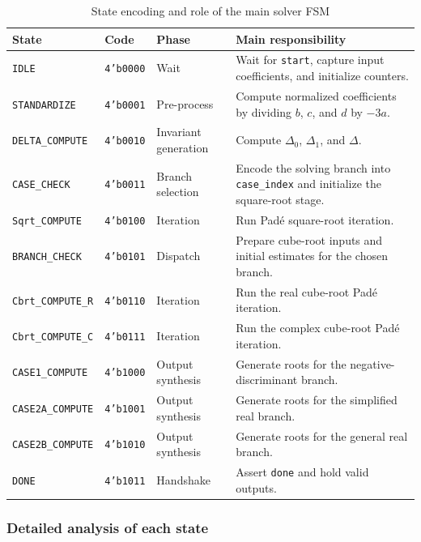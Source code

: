 \begin{table}[H]
\centering
\caption{State encoding and role of the main solver FSM}
\renewcommand{\arraystretch}{1.2}
\begin{tabular}{lll p{7.8cm}}
\toprule
\textbf{State} & \textbf{Code} & \textbf{Phase} & \textbf{Main responsibility} \\
\midrule
\texttt{IDLE} & \texttt{4'b0000} & Wait & Wait for \texttt{start}, capture input coefficients, and initialize counters. \\
\texttt{STANDARDIZE} & \texttt{4'b0001} & Pre-process & Compute normalized coefficients by dividing $b$, $c$, and $d$ by $-3a$. \\
\texttt{DELTA\_COMPUTE} & \texttt{4'b0010} & Invariant generation & Compute $\Delta_0$, $\Delta_1$, and $\Delta$. \\
\texttt{CASE\_CHECK} & \texttt{4'b0011} & Branch selection & Encode the solving branch into \texttt{case\_index} and initialize the square-root stage. \\
\texttt{Sqrt\_COMPUTE} & \texttt{4'b0100} & Iteration & Run Pad\'e square-root iteration. \\
\texttt{BRANCH\_CHECK} & \texttt{4'b0101} & Dispatch & Prepare cube-root inputs and initial estimates for the chosen branch. \\
\texttt{Cbrt\_COMPUTE\_R} & \texttt{4'b0110} & Iteration & Run the real cube-root Pad\'e iteration. \\
\texttt{Cbrt\_COMPUTE\_C} & \texttt{4'b0111} & Iteration & Run the complex cube-root Pad\'e iteration. \\
\texttt{CASE1\_COMPUTE} & \texttt{4'b1000} & Output synthesis & Generate roots for the negative-discriminant branch. \\
\texttt{CASE2A\_COMPUTE} & \texttt{4'b1001} & Output synthesis & Generate roots for the simplified real branch. \\
\texttt{CASE2B\_COMPUTE} & \texttt{4'b1010} & Output synthesis & Generate roots for the general real branch. \\
\texttt{DONE} & \texttt{4'b1011} & Handshake & Assert \texttt{done} and hold valid outputs. \\
\bottomrule
\end{tabular}
\end{table}

\subsubsection{Detailed analysis of each state}

